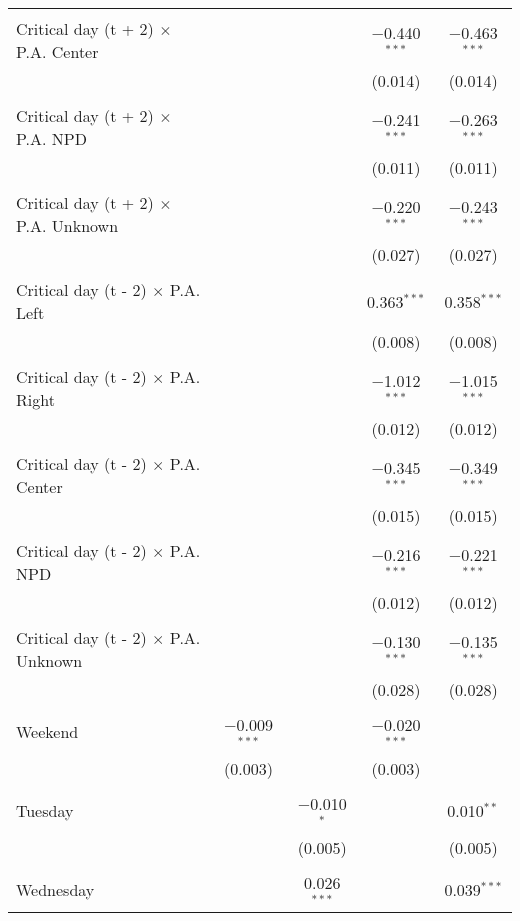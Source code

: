 \documentclass[
]{article}
\begin{document}
\begin{table}[!htbp]
{\begin{tabular}{@{\extracolsep{5pt}}lcccc}
  & & & & \\ 
 Critical day (t + 2) $\times$ P.A. Center &  &  & $-$0.440$^{***}$ & $-$0.463$^{***}$ \\ 
  &  &  & (0.014) & (0.014) \\ 
  & & & & \\ 
 Critical day (t + 2) $\times$ P.A. NPD &  &  & $-$0.241$^{***}$ & $-$0.263$^{***}$ \\ 
  &  &  & (0.011) & (0.011) \\ 
  & & & & \\ 
 Critical day (t + 2) $\times$ P.A. Unknown &  &  & $-$0.220$^{***}$ & $-$0.243$^{***}$ \\ 
  &  &  & (0.027) & (0.027) \\ 
  & & & & \\ 
 Critical day (t - 2) $\times$ P.A. Left &  &  & 0.363$^{***}$ & 0.358$^{***}$ \\ 
  &  &  & (0.008) & (0.008) \\ 
  & & & & \\ 
 Critical day (t - 2) $\times$ P.A. Right &  &  & $-$1.012$^{***}$ & $-$1.015$^{***}$ \\ 
  &  &  & (0.012) & (0.012) \\ 
  & & & & \\ 
 Critical day (t - 2) $\times$ P.A. Center &  &  & $-$0.345$^{***}$ & $-$0.349$^{***}$ \\ 
  &  &  & (0.015) & (0.015) \\ 
  & & & & \\ 
 Critical day (t - 2) $\times$ P.A. NPD &  &  & $-$0.216$^{***}$ & $-$0.221$^{***}$ \\ 
  &  &  & (0.012) & (0.012) \\ 
  & & & & \\ 
 Critical day (t - 2) $\times$ P.A. Unknown &  &  & $-$0.130$^{***}$ & $-$0.135$^{***}$ \\ 
  &  &  & (0.028) & (0.028) \\ 
  & & & & \\ 
 Weekend & $-$0.009$^{***}$ &  & $-$0.020$^{***}$ &  \\ 
  & (0.003) &  & (0.003) &  \\ 
  & & & & \\ 
 Tuesday &  & $-$0.010$^{*}$ &  & 0.010$^{**}$ \\ 
  &  & (0.005) &  & (0.005) \\ 
  & & & & \\ 
 Wednesday &  & 0.026$^{***}$ &  & 0.039$^{***}$ \\ 

\end{tabular}}
\end{table}
\end{document}
